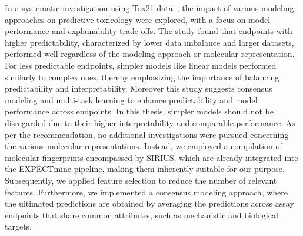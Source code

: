 In a systematic investigation using Tox21 data~\cite{wu2021}, the impact of various modeling approaches on predictive toxicology were explored, with a focus on model performance and explainability trade-offs. The study found that endpoints with higher predictability, characterized by lower data imbalance and larger datasets, performed well regardless of the modeling approach or molecular representation. For less predictable endpoints, simpler models like linear models performed similarly to complex ones, thereby emphasizing the importance of balancing predictability and interpretability. Moreover this study suggests consensus modeling and multi-task learning to enhance predictability and model performance across endpoints. In this thesis, simpler models should not be disregarded due to their higher interpretability and comparable performance. As per the recommendation, no additional investigations were pursued concerning the various molecular representations. Instead, we employed a compilation of molecular fingerprints encompassed by SIRIUS, which are already integrated into the EXPECTmine pipeline, making them inherently suitable for our purpose. Subsequently, we applied feature selection to reduce the number of relevant features. Furthermore, we implemented a consensus modeling approach, where the ultimated predictions are obtained by averaging the predictions across assay endpoints that share common attributes, such as mechanistic and biological targets.